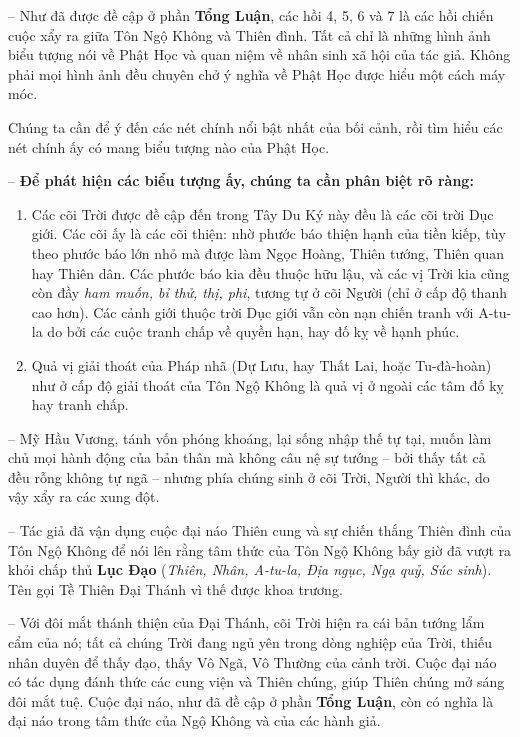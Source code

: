 -- Như đã được đề cập ở phần {\bf Tổng Luận}, các hồi 4, 5, 6 và 7 là các hồi chiến cuộc xẩy ra giữa Tôn Ngộ Không và Thiên đình. Tất cả chỉ là những hình ảnh biểu tượng nói về Phật Học và quan niệm về nhân sinh xã hội của tác giả. Không phải mọi hình ảnh đều chuyên chở ý nghĩa về Phật Học được hiểu một cách máy móc.

Chúng ta cần để ý đến các nét chính nổi bật nhất của bối cảnh, rồi tìm hiểu các nét chính ấy có mang biểu tượng nào của Phật Học.

-- {\bf Để phát hiện các biểu tượng ấy, chúng ta cần phân biệt rõ ràng:}

\begin{enumerate}[label=\itshape\alph*\upshape/]

    \item Các cõi Trời được đề cập đến trong Tây Du Ký này đều là các cõi trời Dục giới. Các cõi ấy là các cõi thiện: nhờ phước báo thiện hạnh của tiền kiếp, tùy theo phước báo lớn nhỏ mà được làm Ngọc Hoàng, Thiên tướng, Thiên quan hay Thiên dân. Các phước báo kia đều thuộc hữu lậu, và các vị Trời kia cũng còn đầy \emph{ham muốn, bỉ thử, thị, phi}, tương tự ở cõi Người (chỉ ở cấp độ thanh cao hơn). Các cảnh giới thuộc trời Dục giới vẫn còn nạn chiến tranh với A-tu-la do bởi các cuộc tranh chấp về quyền hạn, hay đố kỵ về hạnh phúc.

    \item Quả vị giải thoát của Pháp nhã (Dự Lưu, hay Thất Lai, hoặc Tu-đà-hoàn) như ở cấp độ giải thoát của Tôn Ngộ Không là quả vị ở ngoài các tâm đố kỵ hay tranh chấp.
\end{enumerate}

-- Mỹ Hầu Vương, tánh vốn phóng khoáng, lại sống nhập thế tự tại, muốn làm chủ mọi hành động của bản thân mà không câu nệ sự tướng -- bởi thấy tất cả đều rỗng không tự ngã -- nhưng phía chúng sinh ở cõi Trời, Người thì khác, do vậy xẩy ra các xung đột.

-- Tác giả đã vận dụng cuộc đại náo Thiên cung và sự chiến thắng Thiên đình của Tôn Ngộ Không để nói lên rằng tâm thức của Tôn Ngộ Không bấy giờ đã vượt ra khỏi chấp thủ {\bf Lục Đạo} (\emph{Thiên, Nhân, A-tu-la, Địa ngục, Ngạ quỷ, Súc sinh}). Tên gọi Tề Thiên Đại Thánh vì thế được khoa trương.

-- Với đôi mắt thánh thiện của Đại Thánh, cõi Trời hiện ra cái bản tướng lẩm cẩm của nó; tất cả chúng Trời đang ngủ yên trong dòng nghiệp của Trời, thiếu nhân duyên để thấy đạo, thấy Vô Ngã, Vô Thường của cảnh trời. Cuộc đại náo có tác dụng đánh thức các cung viện và Thiên chúng, giúp Thiên chúng mở sáng đôi mắt tuệ. Cuộc đại náo, như đã đề cập ở phần \textbf{Tổng Luận}, còn có nghĩa là đại náo trong tâm thức của Ngộ Không và của các hành giả.

